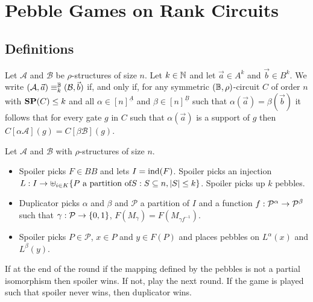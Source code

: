 \documentclass[../main/thesis.tex]{subfiles}
\begin{document}
\section{Pebble Games on Rank Circuits}
\subsection{Definitions}

\begin{definition}
  Let $\mathcal{A}$ and $\mathcal{B}$ be $\rho$-structures of size $n$. Let $k
  \in \mathbb{N}$ and let $\vec{a} \in A^k$ and $\vec{b} \in B^k$. We write
  $(\mathcal{A}, \vec{a}) \equiv^{\mathbb{B}}_k (\mathcal{B}, \vec{b})$ if, and only
  if, for any symmetric $(\mathbb{B}, \rho)$-circuit $C$ of order $n$ with $\text{\textbf{SP}}(C) \leq
  k$ and all $\alpha \in [n]^{\underline{A}}$ and $\beta \in
  [n]^{\underline{B}}$ such that $\alpha(\vec{a}) = \beta(\vec{b})$ it follows
  that for every gate $g$ in $C$ such that $\alpha(\vec{a})$ is a support of $g$
  then $C[\alpha \mathcal{A}](g) = C[\beta \mathcal{B}] (g)$.
\end{definition}

\begin{definition}
  Let $\mathcal{A}$ and $\mathcal{B}$ with $\rho$-structures of size $n$.
  \begin{itemize}
    
  \item Spoiler picks $F \in BB$ and lets $I = \text{\upshape ind}(F)$. Spoiler picks an
    injection $L : I \rightarrow \uplus_{i \in K} \{P \text{ a partition of} S : S
    \subseteq n, \vert S \vert \leq k\}$. Spoiler picks up $k$ pebbles.
    
  \item Duplicator picks $\alpha$ and $\beta$ and $\mathcal{P}$ a partition of
    $I$ and a function $f : \mathcal{P}^\alpha \rightarrow \mathcal{P}^{\beta}$ such
    that $\gamma : \mathcal{P} \rightarrow \{0,1\}$, $F(M_\gamma) = F(M_{\gamma
      f^{-1}})$.

  \item Spoiler picks $P \in \mathcal{P}$, $x \in P$ and $y \in F(P)$ and places
    pebbles on $L^{\alpha}(x)$ and $L^{\beta}(y)$.
  \end{itemize}
  
  If at the end of the round if the mapping defined by the pebbles is not a
  partial isomorphism then spoiler wins. If not, play the next round. If the
  game is played such that spoiler never wins, then duplicator wins.
\end{definition}
\end{document}
